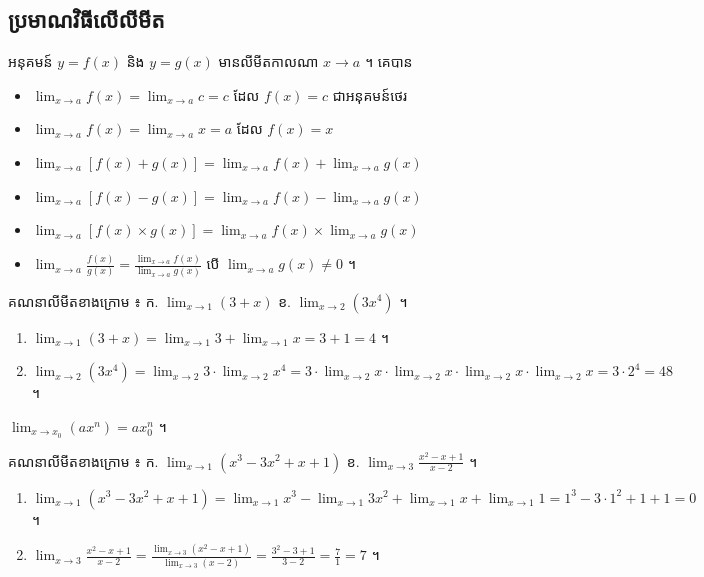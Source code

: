 \subsection{ប្រមាណវិធីលើលីមីត}

អនុគមន៍ $y = f(x)$ និង $y = g(x)$ មានលីមីតកាលណា $x \to a$ ។ គេបាន
\begin{itemize}
  \item $\displaystyle\lim_{x \to a} f(x) = \lim_{x \to a} c = c$ ដែល $f(x) = c$ ជាអនុគមន៍ថេរ
  \item $\displaystyle\lim_{x \to a} f(x) = \lim_{x \to a} x = a$ ដែល $f(x) = x$
  \item $\displaystyle\lim_{x \to a}[f(x) + g(x)] = \lim_{x \to a} f(x) + \lim_{x \to a} g(x)$
  \item $\displaystyle\lim_{x \to a}[f(x) - g(x)] = \lim_{x \to a} f(x) - \lim_{x \to a} g(x)$
  \item $\displaystyle\lim_{x \to a}[f(x)\times g(x)] = \lim_{x \to a} f(x)\times\lim_{x \to a} g(x)$
  \item $\displaystyle\lim_{x \to a}\frac{f(x)}{g(x)} = \frac{\lim_{x \to a} f(x)}{\lim_{x \to a} g(x)}$ បើ $\displaystyle\lim_{x \to a} g(x) \ne 0$ ។
\end{itemize}

\begin{example}[លំហាត់គំរូ ១]
គណនាលីមីតខាងក្រោម ៖ \quad ក. $\displaystyle\lim_{x \to 1}(3 + x)$ \quad ខ. $\displaystyle\lim_{x \to 2}(3x^4)$ ។
\end{example}
\ans
\begin{enumerate}[a]
  \item $\displaystyle\lim_{x \to 1}(3 + x) = \lim_{x \to 1} 3 + \lim_{x \to 1} x = 3 + 1 = 4$ ។
  \item $\displaystyle\lim_{x \to 2}(3x^4) = \lim_{x \to 2} 3\cdot\lim_{x \to 2} x^4 = 3\cdot\lim_{x \to 2} x\cdot\lim_{x \to 2} x\cdot\lim_{x \to 2} x\cdot\lim_{x \to 2} x = 3\cdot 2^4 = 48$ ។
\end{enumerate}

\begin{formulaBox}[ជាទូទៅ]
$\displaystyle\lim_{x \to x_0}(ax^n) = ax_0^n$ ។
\end{formulaBox}

\begin{example}[លំហាត់គំរូ ២]
គណនាលីមីតខាងក្រោម ៖ \quad ក. $\displaystyle\lim_{x \to 1}(x^3 - 3x^2 + x + 1)$ \quad ខ. $\displaystyle\lim_{x \to 3}\frac{x^2 - x + 1}{x - 2}$ ។
\end{example}
\ans
\begin{enumerate}[a]
  \item $\displaystyle\lim_{x \to 1}(x^3 - 3x^2 + x + 1) = \lim_{x \to 1} x^3 - \lim_{x \to 1} 3x^2 + \lim_{x \to 1} x + \lim_{x \to 1} 1 = 1^3 - 3\cdot 1^2 + 1 + 1 = 0$ ។
  \item $\displaystyle\lim_{x \to 3}\frac{x^2 - x + 1}{x - 2} = \frac{\lim_{x \to 3}(x^2 - x + 1)}{\lim_{x \to 3}(x - 2)} = \frac{3^2 - 3 + 1}{3 - 2} = \frac{7}{1} = 7$ ។
\end{enumerate}

